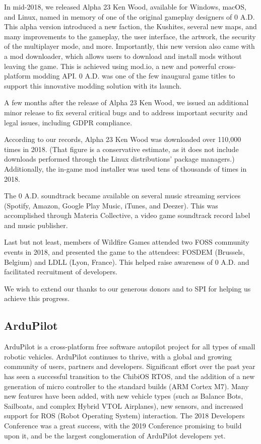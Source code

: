 \documentclass[a4paper]{report}
\begin{document}
In mid-2018, we released Alpha 23 Ken Wood, available for Windows,
macOS, and Linux, named in memory of one of the original gameplay
designers of 0 A.D. This alpha version introduced a new faction, the
Kushites, several new maps, and many improvements to the gameplay, the
user interface, the artwork, the security of the multiplayer mode, and
more.  Importantly, this new version also came with a mod downloader,
which allows users to download and install mods without leaving the
game. This is achieved using mod.io, a new and powerful cross-platform
modding API.  0 A.D. was one of the few inaugural game titles to support
this innovative modding solution with its launch.

A few months after the release of Alpha 23 Ken Wood, we issued an
additional minor release to fix several critical bugs and to address
important security and legal issues, including GDPR compliance.

According to our records, Alpha 23 Ken Wood was downloaded over 110,000
times in 2018. (That figure is a conservative estimate, as it does not
include downloads performed through the Linux distributions' package
managers.) Additionally, the in-game mod installer was used tens of
thousands of times in 2018.

The 0 A.D. soundtrack became available on several music streaming
services (Spotify, Amazon, Google Play Music, iTunes, and Deezer). This
was accomplished through Materia Collective, a video game soundtrack
record label and music publisher.

Last but not least, members of Wildfire Games attended two FOSS
community events in 2018, and presented the game to the attendees:
FOSDEM (Brussels, Belgium) and LDLL (Lyon, France). This helped raise
awareness of 0 A.D. and facilitated recruitment of developers.

We wish to extend our thanks to our generous donors and to SPI for
helping us achieve this progress.

\subsection{ArduPilot}

ArduPilot is a cross-platform free software autopilot project for all
types of small robotic vehicles.  ArduPilot continues to thrive, with a
global and growing community of users, partners and developers.
Significant effort over the past year has seen a successful transition
to the ChibiOS RTOS, and the addition of a new generation of micro
controller to the standard builds (ARM Cortex M7).  Many new features
have been added, with new vehicle types (such as Balance Bots,
Sailboats, and complex Hybrid VTOL Airplanes), new sensors, and
increased support for ROS (Robot Operating System) interaction.  The
2018 Developers Conference was a great success, with the 2019 Conference
promising to build upon it, and be the largest conglomeration of
ArduPilot developers yet.
\end{document}
